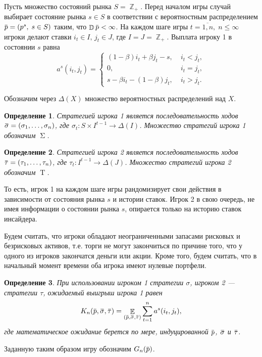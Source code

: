 \documentclass[12pt, draft]{extarticle}
\newtheorem{definition}{Определение}
\newcommand{\overbar}[1]%
{\mkern 1.5mu\overline{\mkern-1.3mu#1\mkern-1.3mu}\mkern 1.3mu}
\newcommand{\s}{\ensuremath{s}}
\newcommand{\p}{\ensuremath{\overbar{p}}}
\DeclareMathOperator{\E}{\mathbb{E}}
\DeclareMathOperator{\D}{\mathbb{D}}
\DeclareMathOperator{\Z}{\mathbb{Z}}
\newcommand{\G}[1][n]{\ensuremath{G_{#1}}}
\newcommand{\K}[1][n]{\ensuremath{K_{#1}}}
\DeclareMathOperator{\FPStrategies}{\Sigma}
\DeclareMathOperator{\SPStrategies}{\mathrm{T}}
\newcommand{\sigmav}{\ensuremath{\overbar{\sigma}}}
\newcommand{\tauv}{\ensuremath{\overbar{\tau}}}
\begin{document}
Пусть множество состояний рынка $S = \Z_+$. Перед началом игры случай выбирает
состояние рынка $\s \in S$ в соответствии с вероятностным распределением $\p =
(p^s, \; s \in S)$ таким, что $\D \p < \infty$. На каждом шаге игры $t =
\overline{1,n}, \; n \leqslant \infty$ игроки делают ставки $i_t \in I, \, j_t
\in J$, где $I = J = \Z_+$. Выплата игроку 1 в состоянии $s$ равна
\begin{equation*}
  a^s(i_t, j_t) =
  \begin{cases}
    (1-\beta) i_t + \beta j_t - s, &\; i_t < j_t, \\
    0, &\; i_t = j_t, \\
    s - \beta i_t - (1-\beta)j_t, &\; i_t > j_t.
  \end{cases}
\end{equation*}

Обозначим через $\Delta(X)$ множество вероятностных распределений над $X$.
\begin{definition}
  Стратегией игрока 1 является последовательность ходов $\sigmav = (\sigma_1,
  \ldots, \sigma_n)$, где $\sigma_t: S \times I^{t-1} \rightarrow \Delta(I)$.
  Множество стратегий игрока 1 обозначим $\FPStrategies$.
\end{definition}

\begin{definition}
  Стратегией игрока 2 является последовательность ходов $\tauv = (\tau_1,
  \ldots, \tau_n)$, где $\tau_t: I^{t-1} \rightarrow \Delta(J)$. Множество
  стратегий игрока 2 обозначим $\SPStrategies$.
\end{definition}

То есть, игрок 1 на каждом шаге игры рандомизирует свои действия в зависимости
от состояния рынка $s$ и истории ставок. Игрок 2 в свою очередь, не имея
информации о состоянии рынка $s$, опирается только на историю ставок инсайдера.

Будем считать, что игроки обладают неограниченными запасами рисковых и
безрисковых активов, т.е. торги не могут закончиться по причине того, что у
одного из игроков закончатся деньги или акции. Кроме того, будем считать, что в
начальный момент времени оба игрока имеют нулевые портфели.

\begin{definition}
  При использовании игроком 1 стратегии $\sigma$, игроком 2 --- стратегии
  $\tau$, ожидаемый выигрыш игрока 1 равен
  \begin{equation*}
    \K(\p, \sigmav, \tauv) =
    \E_{(\p, \sigmav, \tauv)} \sum_{t=1}^n a^s(i_t, j_t),
  \end{equation*}
  где математическое ожидание берется по мере, индуцированной $\p$, $\sigmav$ и
  $\tauv$.
\end{definition}
Заданную таким образом игру обозначим $\G(\p)$.
\end{document}
